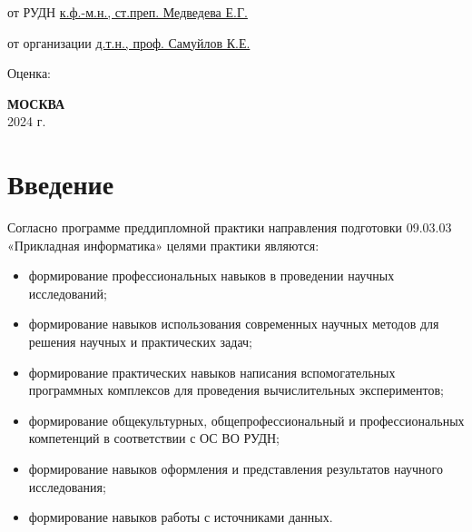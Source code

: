 \documentclass{article}
\begin{document}
\begin{titlepage}
\begin{adjustwidth}{0.5\textwidth}{0pt}
    от РУДН \underline{к.ф.-м.н., ст.преп. Медведева Е.Г.}

    от организации \underline{д.т.н., проф. Самуйлов К.Е.}
     
     \end{adjustwidth}
    
    Оценка: \underline{\phantom{1234567890 баллов}}
    
     
    \begin{center} \textbf{МОСКВА} \\ 2024 г. \end{center}
    \thispagestyle{empty} %
     
    \end{titlepage}
    
    \newpage


\section{Введение}

Согласно программе преддипломной практики направления подготовки 09.03.03 «Прикладная информатика» целями практики являются:
\begin{itemize}
\item формирование профессиональных навыков в проведении научных исследований;
\item формирование навыков использования современных научных методов для решения научных и практических задач;
\item формирование практических навыков написания вспомогательных программных комплексов для проведения вычислительных экспериментов;
\item формирование общекультурных, общепрофессиональный и профессиональных компетенций в соответствии с ОС ВО РУДН;
\item формирование навыков оформления и представления результатов научного исследования;
\item формирование навыков работы с источниками данных.
\end{itemize}
\end{document}
